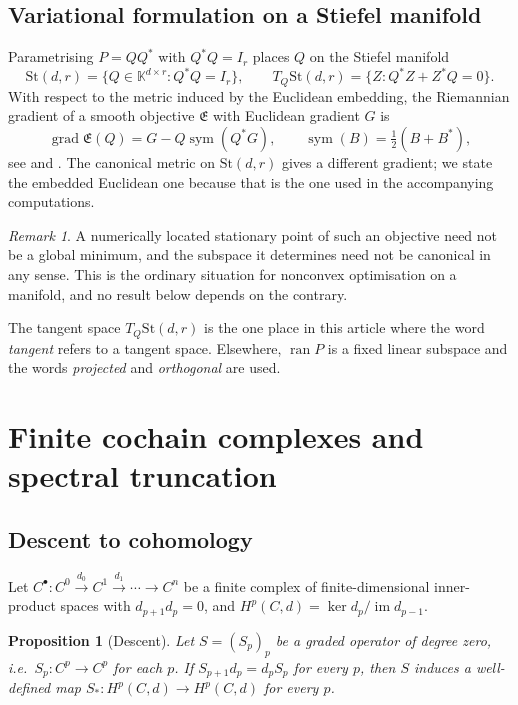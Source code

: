 \documentclass[11pt]{amsart}
\newtheorem{proposition}[theorem]{Proposition}
\theoremstyle{definition}
\theoremstyle{remark}
\newtheorem{remark}[theorem]{Remark}
\newcommand{\ran}{\operatorname{ran}}
\newcommand{\Energy}{\mathfrak E}
\begin{document}
\subsection{Variational formulation on a Stiefel manifold}

Parametrising $P=QQ^{*}$ with $Q^{*}Q=I_r$ places $Q$ on the Stiefel manifold
\[
 \mathrm{St}(d,r)=\{Q\in\mathbb K^{d\times r}:Q^{*}Q=I_r\},
 \qquad
 T_Q\mathrm{St}(d,r)=\{Z:Q^{*}Z+Z^{*}Q=0\}.
\]
With respect to the metric induced by the Euclidean embedding, the Riemannian gradient of
a smooth objective $\Energy$ with Euclidean gradient $G$ is
\[
 \operatorname{grad}\Energy(Q)=G-Q\operatorname{sym}(Q^{*}G),
 \qquad
 \operatorname{sym}(B)=\tfrac12(B+B^{*}),
\]
see \cite[Sec.~2.4]{EdelmanAriasSmith1998} and \cite[Ch.~3]{AbsilMahonySepulchre2008}. The
canonical metric on $\mathrm{St}(d,r)$ gives a different gradient; we state the embedded
Euclidean one because that is the one used in the accompanying computations.

\begin{remark}
\label{rem:localmin}
A numerically located stationary point of such an objective need not be a global minimum,
and the subspace it determines need not be canonical in any sense. This is the ordinary
situation for nonconvex optimisation on a manifold, and no result below depends on the
contrary.
\end{remark}

The tangent space $T_Q\mathrm{St}(d,r)$ is the one place in this article where the word
\emph{tangent} refers to a tangent space. Elsewhere, $\ran P$ is a fixed linear subspace
and the words \emph{projected} and \emph{orthogonal} are used.

\section{Finite cochain complexes and spectral truncation}
\label{sec:cohomology}

\subsection{Descent to cohomology}

Let $C^{\bullet}:C^{0}\xrightarrow{d_0}C^{1}\xrightarrow{d_1}\cdots\to C^{n}$ be a finite
complex of finite-dimensional inner-product spaces with $d_{p+1}d_p=0$, and
$H^{p}(C,d)=\ker d_p/\operatorname{im}d_{p-1}$.

\begin{proposition}[Descent]
\label{prop:descent}
Let $S=(S_p)_{p}$ be a graded operator \emph{of degree zero}, i.e.\ $S_p:C^{p}\to C^{p}$
for each $p$. If $S_{p+1}d_p=d_pS_p$ for every $p$, then $S$ induces a well-defined map
$S_{*}:H^{p}(C,d)\to H^{p}(C,d)$ for every $p$.
\end{proposition}
\end{document}
